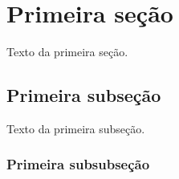 \documentclass[a4paper,12pt,oneside,onecolumn,final,fleqn]{repUERJ}
\begin{document}




\appendix %






\annex %


\section{Primeira seção}

Texto da primeira seção.

\subsection{Primeira subseção}

Texto da primeira subseção.

\subsubsection{Primeira subsubseção}
\end{document}
